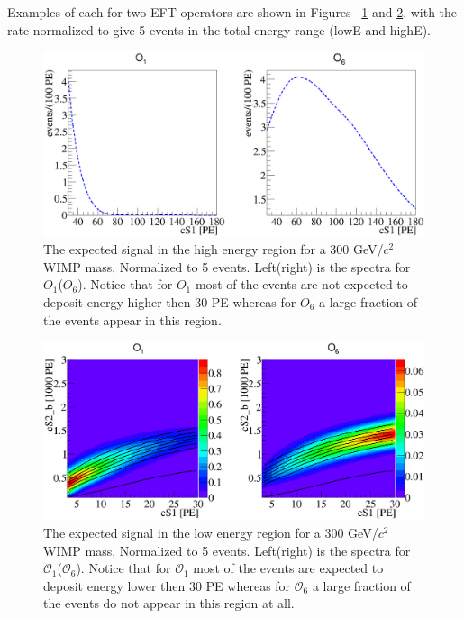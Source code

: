 Examples of each for two EFT operators are shown in Figures ~\ref{fig:HighE} and \ref{fig:LowE}, with the rate normalized to give 5 events in the total energy range (lowE and highE).

\begin{figure}[h!]
\begin{minipage}{1.\linewidth}
\centerline{\includegraphics[width=1.\linewidth]{Figures/SigHighO1O6.eps}}
\end{minipage}
\caption{The expected signal in the high energy region for a 300 GeV/$c^2$ WIMP mass, Normalized to 5 events. Left(right) is the spectra for $O_1$($O_6$). Notice that for $O_1$ most of the events are not expected to deposit energy higher then 30 PE whereas for $O_6$ a large fraction of the events appear in this region.}
\label{fig:HighE}
\end{figure} 

\begin{figure}[h!]
\begin{minipage}{1.\linewidth}
\centerline{\includegraphics[width=1.\linewidth]{Figures/SigLowO1O6.eps}}
\end{minipage}
\caption{The expected signal in the low energy region for a 300 GeV/$c^2$ WIMP mass, Normalized to 5 events. Left(right) is the spectra for $\mathcal{O}_1$($\mathcal{O}_6$). Notice that for $\mathcal{O}_1$ most of the events are expected to deposit energy lower then 30 PE whereas for $\mathcal{O}_6$ a large fraction of the events do not appear in this region at all.}
\label{fig:LowE}
\end{figure}




